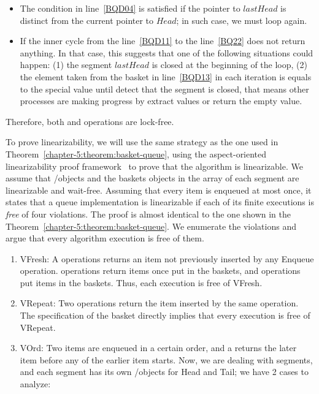 \begin{proofT}
  \begin{itemize}
    \item The condition in line~\ref{BQD04} is satisfied if the pointer to \(lastHead\) is distinct from the current pointer to \(Head\); in such case, we must loop again.
    \item If the inner cycle from the line~\ref{BQD11} to the line~\ref{BQ22} does not return anything. In that case, this suggests that one of the following situations could happen: (1) the segment \(lastHead\) is closed at the beginning of the loop, (2) the element taken from the basket in line~\ref{BQD13} in each iteration is equals to the special value \closed until detect that the segment is closed, that means other processes are making progress by extract values or return the empty value.
  \end{itemize}

  Therefore, both \Enq and \Deq operations are lock-free.

  To prove linearizability, we will use the same strategy as the one used in Theorem~\ref{chapter-5:theorem:basket-queue}, using the aspect-oriented linearizability proof framework~\cite{DBLP_conf_concur_HenzingerSV13} to prove that the algorithm is linearizable. We assume that \LL/\IC objects and the baskets objects in the array of each segment are linearizable and wait-free\footnotemark. Assuming that every item is enqueued at most once, it states that a queue implementation is linearizable if each of its finite executions is \emph{free} of four violations. The proof is almost identical to the one shown in the Theorem~\ref{chapter-5:theorem:basket-queue}. We enumerate the violations and argue that every algorithm execution is free of them.

  \begin{enumerate}
    \item VFresh: A \Deq operations returns an item not previously inserted by any Enqueue operation. \Deq operations return items once put in the baskets, and \Enq operations put items in the baskets. Thus, each execution is free of VFresh.
    \item VRepeat: Two \Deq operations return the item inserted by the same \Enq operation. The specification of the basket directly implies that every execution is free of VRepeat.
    \item VOrd: Two items are enqueued in a certain order, and a \Deq returns the later item before any \Deq of the earlier item starts. Now, we are dealing with segments, and each segment has its own \LL/\IC objects for Head and Tail; we have 2 cases to analyze:


\end{enumerate}
\end{proofT}
